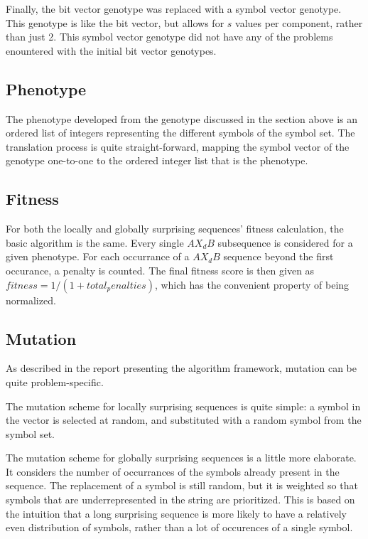 \documentclass{article}
\begin{document}
Finally, the bit vector genotype was replaced with a symbol vector genotype.
This genotype is like the bit vector, but allows for $ s $ values per component, rather than just 2.
This symbol vector genotype did not have any of the problems enountered with the initial bit vector genotypes.

\subsection{Phenotype}

The phenotype developed from the genotype discussed in the section above is an ordered list of integers representing the different symbols of the symbol set.
The translation process is quite straight-forward, mapping the symbol vector of the genotype one-to-one to the ordered integer list that is the phenotype.

\subsection{Fitness}
For both the locally and globally surprising sequences' fitness calculation, the basic algorithm is the same.
Every single $ AX_dB $ subsequence is considered for a given phenotype.
For each occurrance of a $ AX_dB $ sequence beyond the first occurance, a penalty is counted.
The final fitness score is then given as $ fitness = 1 / (1 + total_penalties) $, which has the convenient property of being normalized.


\subsection{Mutation}
As described in the report presenting the algorithm framework, mutation can be quite problem-specific.

The mutation scheme for locally surprising sequences is quite simple: a symbol in the vector is selected at random, and substituted with a random symbol from the symbol set.

The mutation scheme for globally surprising sequences is a little more elaborate.
It considers the number of occurrances of the symbols already present in the sequence.
The replacement of a symbol is still random, but it is weighted so that symbols that are underrepresented in the string are prioritized.
This is based on the intuition that a long surprising sequence is more likely to have a relatively even distribution of symbols, rather than a lot of occurences of a single symbol.
\end{document}
